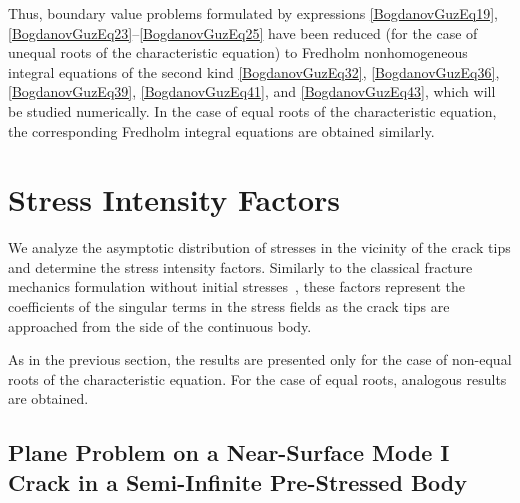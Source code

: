 Thus, boundary value problems formulated by expressions
\eqref{BogdanovGuzEq19}, \eqref{BogdanovGuzEq23}--\eqref{BogdanovGuzEq25}
have been reduced (for the case of unequal roots of the characteristic equation)
to Fredholm nonhomogeneous integral equations of the second kind
\eqref{BogdanovGuzEq32}, \eqref{BogdanovGuzEq36},
\eqref{BogdanovGuzEq39}, \eqref{BogdanovGuzEq41},
and \eqref{BogdanovGuzEq43}, which will be studied numerically.
In the case of equal roots of the characteristic equation,
the corresponding Fredholm integral equations are obtained similarly.

\section{Stress Intensity Factors}

We analyze the asymptotic distribution of stresses in the vicinity of the crack tips and determine the stress intensity factors. Similarly to the classical fracture mechanics formulation without initial stresses~\cite{BogdanovGuz16,BogdanovGuz21}, these factors represent the coefficients of the singular terms in the stress fields as the crack tips are approached from the side of the continuous body. 

As in the previous section, the results are presented only for the case of non-equal roots of the characteristic equation. For the case of equal roots, analogous results are obtained.

\subsection{Plane Problem on a Near-Surface Mode I Crack in a Semi-Infinite Pre-Stressed Body}


